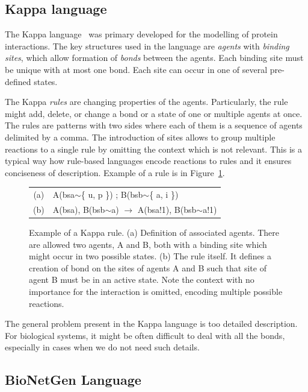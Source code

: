 \documentclass[11pt,a4paper]{report}
\begin{document}
\subsection{Kappa language}
\label{kappa}

The Kappa language~\cite{kappa_formal} was primary developed for the modelling of protein interactions. The key structures used in the language are \emph{agents} with \emph{binding sites}, which allow formation of \emph{bonds} between the agents. Each binding site must be unique with at most one bond. Each site can occur in one of several pre-defined states.

The Kappa \emph{rules} are changing properties of the agents. Particularly, the rule might add, delete, or change a bond or a state of one or multiple agents at once. The rules are patterns with two sides where each of them is a sequence of agents delimited by a comma. The introduction of sites allows to group multiple reactions to a single rule by omitting the context which is not relevant. This is a typical way how rule-based languages encode reactions to rules and it ensures conciseness of description. Example of a rule is in Figure~\ref{kappa-rule}.

\begin{figure}[!h]
\begin{center}
\begin{tabular}{c l}
(a) & A(bsa$\sim$\{ u, p \}) ; B(bsb$\sim$\{ a, i \}) \\
(b) & A(bsa), B(bsb$\sim$a) $\rightarrow$ A(bsa!1), B(bsb$\sim$a!1) \\
\end{tabular}
\end{center}
\caption{Example of a Kappa rule. (a) Definition of associated agents. There are allowed two agents, A and B, both with a binding site which might occur in two possible states. (b) The rule itself. It defines a creation of bond on the sites of agents A and B such that site of agent B must be in an active state. Note the context with no importance for the interaction is omitted, encoding multiple possible reactions.}\label{kappa-rule}
\end{figure}

The general problem present in the Kappa language is too detailed description. For biological systems, it might be often difficult to deal with all the bonds, especially in cases when we do not need such details.

\subsection{BioNetGen Language}
\label{bngl}
\end{document}
